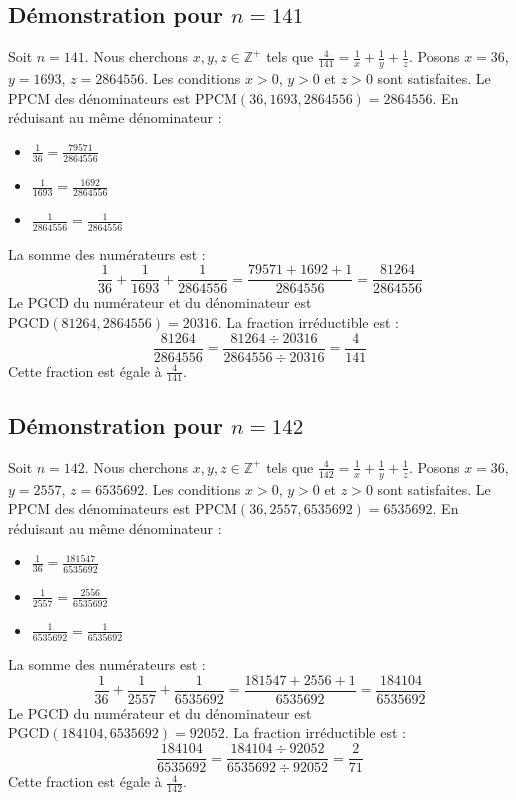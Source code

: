 \documentclass[11pt,a4paper]{article}
\begin{document}
\subsection{Démonstration pour $n = 141$}
Soit $n = 141$. Nous cherchons $x, y, z \in \mathbb{Z}^{+}$ tels que $\frac{4}{141} = \frac{1}{x} + \frac{1}{y} + \frac{1}{z}$.
Posons $x = 36$, $y = 1693$, $z = 2864556$.
Les conditions $x > 0$, $y > 0$ et $z > 0$ sont satisfaites.
Le PPCM des dénominateurs est $\text{PPCM}(36, 1693, 2864556) = 2864556$.
En réduisant au même dénominateur :
\begin{itemize}
    \item $\frac{1}{36} = \frac{79571}{2864556}$
    \item $\frac{1}{1693} = \frac{1692}{2864556}$
    \item $\frac{1}{2864556} = \frac{1}{2864556}$
\end{itemize}
La somme des numérateurs est :
$$ \frac{1}{36} + \frac{1}{1693} + \frac{1}{2864556} = \frac{79571 + 1692 + 1}{2864556} = \frac{81264}{2864556} $$
Le PGCD du numérateur et du dénominateur est $\text{PGCD}(81264, 2864556) = 20316$.
La fraction irréductible est :
$$ \frac{81264}{2864556} = \frac{81264 \div 20316}{2864556 \div 20316} = \frac{4}{141} $$
Cette fraction est égale à $\frac{4}{141}$.

\subsection{Démonstration pour $n = 142$}
Soit $n = 142$. Nous cherchons $x, y, z \in \mathbb{Z}^{+}$ tels que $\frac{4}{142} = \frac{1}{x} + \frac{1}{y} + \frac{1}{z}$.
Posons $x = 36$, $y = 2557$, $z = 6535692$.
Les conditions $x > 0$, $y > 0$ et $z > 0$ sont satisfaites.
Le PPCM des dénominateurs est $\text{PPCM}(36, 2557, 6535692) = 6535692$.
En réduisant au même dénominateur :
\begin{itemize}
    \item $\frac{1}{36} = \frac{181547}{6535692}$
    \item $\frac{1}{2557} = \frac{2556}{6535692}$
    \item $\frac{1}{6535692} = \frac{1}{6535692}$
\end{itemize}
La somme des numérateurs est :
$$ \frac{1}{36} + \frac{1}{2557} + \frac{1}{6535692} = \frac{181547 + 2556 + 1}{6535692} = \frac{184104}{6535692} $$
Le PGCD du numérateur et du dénominateur est $\text{PGCD}(184104, 6535692) = 92052$.
La fraction irréductible est :
$$ \frac{184104}{6535692} = \frac{184104 \div 92052}{6535692 \div 92052} = \frac{2}{71} $$
Cette fraction est égale à $\frac{4}{142}$.
\end{document}
